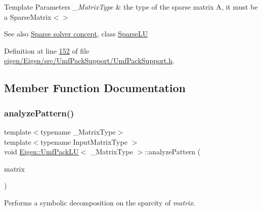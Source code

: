 \begin{DoxyTemplParams}{Template Parameters}
{\em \+\_\+\+Matrix\+Type} & the type of the sparse matrix A, it must be a Sparse\+Matrix$<$$>$\\
\hline
\end{DoxyTemplParams}


\begin{DoxySeeAlso}{See also}
\hyperlink{SparseLinearSystems.dox_TutorialSparseSolverConcept}{Sparse solver concept}, class \hyperlink{group___sparse_l_u___module_class_eigen_1_1_sparse_l_u}{Sparse\+LU} 
\end{DoxySeeAlso}


Definition at line \hyperlink{eigen_2_eigen_2src_2_umf_pack_support_2_umf_pack_support_8h_source_l00152}{152} of file \hyperlink{eigen_2_eigen_2src_2_umf_pack_support_2_umf_pack_support_8h_source}{eigen/\+Eigen/src/\+Umf\+Pack\+Support/\+Umf\+Pack\+Support.\+h}.



\subsection{Member Function Documentation}
\mbox{\label{class_eigen_1_1_umf_pack_l_u_ac7ea28b2017d6b26b7b08497f294e5e6}} 
\subsubsection{\texorpdfstring{analyze\+Pattern()}{analyzePattern()}\hspace{0.1cm}{\footnotesize\ttfamily [1/2]}}
{\footnotesize\ttfamily template$<$typename \+\_\+\+Matrix\+Type$>$ \\
template$<$typename Input\+Matrix\+Type $>$ \\
void \hyperlink{class_eigen_1_1_umf_pack_l_u}{Eigen\+::\+Umf\+Pack\+LU}$<$ \+\_\+\+Matrix\+Type $>$\+::analyze\+Pattern (\begin{DoxyParamCaption}\item[{const Input\+Matrix\+Type \&}]{matrix }\end{DoxyParamCaption})\hspace{0.3cm}{\ttfamily [inline]}}

Performs a symbolic decomposition on the sparcity of {\itshape matrix}.

